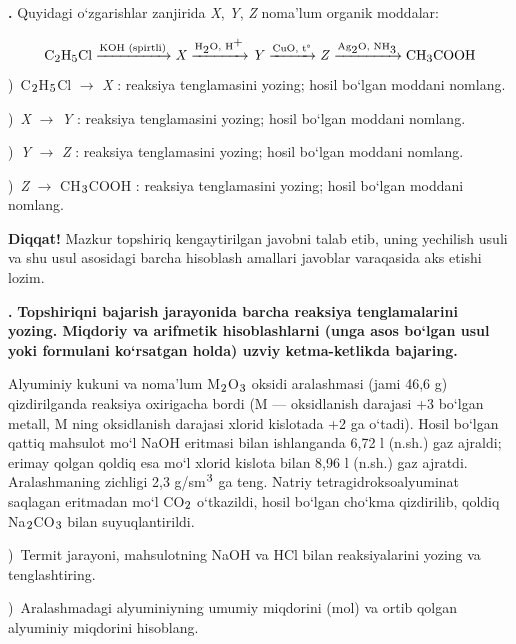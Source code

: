 \documentclass[11pt,a4paper]{article}
\renewcommand{\textsubscript}[1]{\ensuremath{_{\text{\fontsize{8}{8}\selectfont #1}}}}
\renewcommand{\textsuperscript}[1]{\ensuremath{^{\text{\fontsize{8}{8}\selectfont #1}}}}
\newcommand{\qn}[1]{\textbf{\fontsize{11.5}{13}\selectfont #1}}
\newcommand{\qsep}{\par\vspace{13pt}}
\newcommand{\diqqat}[1]{\par\smallskip\noindent\textbf{Diqqat!} #1\par\medskip}
\begin{document}
\noindent\qn{42.} Quyidagi o`zgarishlar zanjirida \textit{X}, \textit{Y}, \textit{Z} noma'lum organik moddalar:\par
\[\setlength{\fboxsep}{0pt}\text{C\textsubscript{2}H\textsubscript{5}Cl}\xrightarrow{\text{KOH (spirtli)}}\text{\textit{X}}\xrightarrow{\text{H\textsubscript{2}O, H\textsuperscript{+}}}\text{\textit{Y}}\xrightarrow{\text{CuO, t\textdegree{}}}\text{\textit{Z}}\xrightarrow{\text{Ag\textsubscript{2}O, NH\textsubscript{3}}}\text{CH\textsubscript{3}COOH}\]
)\ C\textsubscript{2}H\textsubscript{5}Cl $\to$ \textit{X} : reaksiya tenglamasini yozing; hosil bo`lgan moddani nomlang.\par
{})\ \textit{X} $\to$ \textit{Y} : reaksiya tenglamasini yozing; hosil bo`lgan moddani nomlang.\par
{})\ \textit{Y} $\to$ \textit{Z} : reaksiya tenglamasini yozing; hosil bo`lgan moddani nomlang.\par
{})\ \textit{Z} $\to$ CH\textsubscript{3}COOH : reaksiya tenglamasini yozing; hosil bo`lgan moddani nomlang.\par
\diqqat{Mazkur topshiriq kengaytirilgan javobni talab etib, uning yechilish usuli va shu usul asosidagi barcha hisoblash amallari javoblar varaqasida aks etishi lozim.}\qsep
\noindent\qn{43.} \textbf{Topshiriqni bajarish jarayonida barcha reaksiya tenglamalarini yozing. Miqdoriy va arifmetik hisoblashlarni (unga asos bo`lgan usul yoki formulani ko`rsatgan holda) uzviy ketma-ketlikda bajaring.}\par\smallskip
Alyuminiy kukuni va noma'lum M\textsubscript{2}O\textsubscript{3} oksidi aralashmasi (jami 46,6 g) qizdirilganda reaksiya oxirigacha bordi (M --- oksidlanish darajasi +3 bo`lgan metall, M ning oksidlanish darajasi xlorid kislotada +2 ga o`tadi). Hosil bo`lgan qattiq mahsulot mo`l NaOH eritmasi bilan ishlanganda 6,72 l (n.sh.) gaz ajraldi; erimay qolgan qoldiq esa mo`l xlorid kislota bilan 8,96 l (n.sh.) gaz ajratdi. Aralashmaning zichligi 2,3 g/sm\textsuperscript{3} ga teng. Natriy tetragidroksoalyuminat saqlagan eritmadan mo`l CO\textsubscript{2} o`tkazildi, hosil bo`lgan cho`kma qizdirilib, qoldiq Na\textsubscript{2}CO\textsubscript{3} bilan suyuqlantirildi.\par
{})\ Termit jarayoni, mahsulotning NaOH va HCl bilan reaksiyalarini yozing va tenglashtiring.\par
{})\ Aralashmadagi alyuminiyning umumiy miqdorini (mol) va ortib qolgan alyuminiy miqdorini hisoblang.\par
\end{document}
